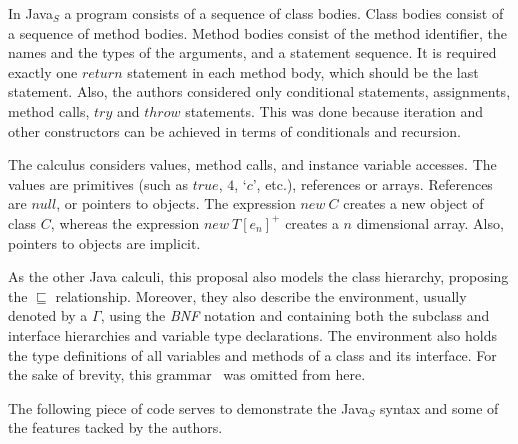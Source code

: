 \documentclass[tese,capa,english]{texufpel}
\def\resethooks{%
  \global\let\SaveRestoreHook\empty
  \global\let\ColumnHook\empty}
\newcommand{\hsindent}[1]{\quad}%
\let\hspre\empty
\let\hspost\empty
\newcommand{\V}[1]{\black{\mathsf{#1}}}
\newcommand{\JK}[1]{\purple{\mathsf{#1}}}
\newcommand{\JC}[1]{\green{\mathsf{#1}}}
\newcommand{\JM}[1]{\blue{\mathsf{#1}}}
\begin{document}
In Java$_S$ a program consists of a sequence of class bodies. Class bodies consist of a sequence of method bodies. Method bodies consist of the method identifier, the names and the types of the arguments, and a statement sequence. It is required exactly one $return$ statement in each method body, which should be the last statement. Also, the authors considered only conditional statements, assignments, method calls, $try$ and $throw$ statements. This was done because iteration and other constructors can be achieved in terms of conditionals and recursion.

The calculus considers values, method calls, and instance variable accesses. The values are primitives (such as $true$, $4$, `$c$', etc.), references or arrays. References are $null$, or pointers to objects. The expression $new ~ C$ creates a new object of class $C$, whereas the expression $new ~ T[e_{n}]^{+}$ creates a $n$ dimensional array. Also, pointers to objects are implicit.

\pagebreak

As the other Java calculi, this proposal also models the class hierarchy, proposing the $\sqsubseteq$ relationship. Moreover, they also describe the environment, usually denoted by a $\Gamma$, using the \emph{BNF} notation and containing both the subclass and interface hierarchies and variable type declarations. The environment also holds the type definitions of all variables and methods of a class and its interface. For the sake of brevity, this grammar~\cite{Drossopoulou:1999:DSJ:645580.658817} was omitted from here.

The following piece of code serves to demonstrate the Java$_S$ syntax and some of the features tacked by the authors.


\resethooks
\end{document}
